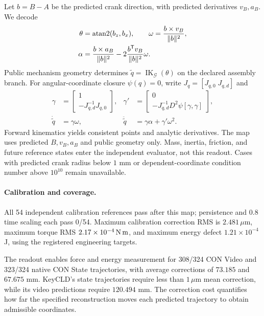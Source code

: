 Let $b=B-A$ be the predicted crank direction, with predicted derivatives $v_B,a_B$. We decode
\begin{align}
\theta&=\operatorname{atan2}(b_z,b_x),\qquad
\omega=\frac{b\times v_B}{\|b\|^2},\\
\alpha&=\frac{b\times a_B}{\|b\|^2}
-2\frac{b^{\mathsf T} v_B}{\|b\|^2}\omega.
\end{align}
Public mechanism geometry determines $\widetilde q=\operatorname{IK}_{\mathcal G}(\theta)$ on the declared assembly branch. For angular-coordinate closure $\psi(q)=0$, write $J_q=[J_{q,0}\;J_{q,d}]$ and
\begin{align}
\gamma&=\begin{bmatrix}1\\-J_{q,d}^{-1}J_{q,0}\end{bmatrix},&
\gamma'&=\begin{bmatrix}0\\-J_{q,d}^{-1}D^2\psi[\gamma,\gamma]\end{bmatrix},\\
\dot{\widetilde q}&=\gamma\omega,&
\ddot{\widetilde q}&=\gamma\alpha+\gamma'\omega^2.
\end{align}
Forward kinematics yields consistent points and analytic derivatives. The map uses predicted $B,v_B,a_B$ and public geometry only. Mass, inertia, friction, and future reference states enter the independent evaluator, not this readout. Cases with predicted crank radius below $1$ mm or dependent-coordinate condition number above $10^{10}$ remain unavailable.

\paragraph{Calibration and coverage.}
All 54 independent calibration references pass after this map; persistence and $0.8$ time scaling each pass 0/54. Maximum calibration correction RMS is $2.481\,\mu$m, maximum torque RMS $2.17\times10^{-4}\,\mathrm{N\,m}$, and maximum energy defect $1.21\times10^{-4}$ J, using the registered engineering targets.



The readout enables force and energy measurement for 308/324 CON Video and 323/324 native CON State trajectories, with average corrections of $73.185$ and $67.675$ mm. KeyCLD's state trajectories require less than $1\,\mu$m mean correction, while its video predictions require $120.494$ mm. The correction cost quantifies how far the specified reconstruction moves each predicted trajectory to obtain admissible coordinates.



